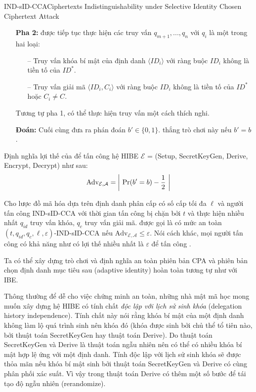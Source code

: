 \documentclass[class=report, crop=false]{standalone}
\begin{document}
\begin{game}{IND-sID-CCA}{Ciphertexts Indistinguishability under Selective Identity Chosen Ciphertext Attack}
\begin{itemize}[leftmargin=1.5cm, itemindent=-0.5cm]
					\item[] \textbf{Pha 2:} \adversary được tiếp tục thực hiện các truy vấn $q_{m + 1}, ..., q_{n}$ với $q_i$ là một trong hai loại:
					\begin{itemize}
						\item[--] Truy vấn khóa bí mật của định danh $\langle ID_i \rangle$ với ràng buộc $ID_i$ không là tiền tố của $ID^*$.
						\item[--] Truy vấn giải mã $\langle ID_i, C_i \rangle$ với ràng buộc $ID_i$ không là tiền tố của $ID^*$ hoặc $C_i \neq C$.
					\end{itemize}
					Tương tự pha 1, \adversary có thể thực hiện truy vấn một cách thích nghi.
					\item[] \textbf{Đoán:} Cuối cùng \adversary đưa ra phán đoán $b' \in \{0, 1\}$. \adversary thắng trò chơi này nếu $b' = b$.
				\end{itemize}
				\vspace{-\baselineskip}
				Định nghĩa lợi thế của \adversary để tấn công hệ HIBE $\mathcal{E}$ = (\textsf{Setup, SecretKeyGen, Derive, Encrypt, Decrypt}) như sau:
				\[
					\text{Adv}_{\mathcal{E}, \mathcal{A}} = \left| \ \text{Pr}(b' = b) - \frac{1}{2} \ \right|
				\]
			\end{game}
			\begin{definition}
				Cho lược đồ mã hóa dựa trên định danh phân cấp \scheme có số cấp tối đa $\ell$ và người tấn công IND-sID-CCA \adversary với thời gian tấn công bị chặn bởi $t$ và thực hiện nhiều nhất $q_{id}$ truy vấn khóa, $q_c$ truy vấn giải mã. \scheme được gọi là có mức an toàn $(t, q_{id}, q_c, \ell, \varepsilon)$-IND-sID-CCA nếu $\text{Adv}_{\mathcal{E}, \mathcal{A}} \leq \varepsilon$. Nói cách khác, mọi người tấn công có khả năng như \adversary có lợi thế nhiều nhất là $\varepsilon$ để tấn công \scheme.
			\end{definition}
			Ta có thể xây dựng trò chơi và định nghĩa an toàn phiên bản CPA và phiên bản chọn định danh mục tiêu sau (adaptive identity) hoàn toàn tương tự như với IBE.

			Thông thường để dễ cho việc chứng minh an toàn, những nhà mật mã học mong muốn xây dựng hệ HIBE có tính chất \textit{độc lập với lịch sử sinh khóa} (delegation history independence). Tính chất này nói rằng khóa bí mật của một định danh không làm lộ quá trình sinh nên khóa đó (khóa được sinh bởi chủ thể tổ tiên nào, bởi thuật toán \textsf{SecretKeyGen} hay thuật toán \textsf{Derive}). Do thuật toán \textsf{SecretKeyGen} và \textsf{Derive} là thuật toán ngẫu nhiên nên có thể có nhiều khóa bí mật hợp lệ ứng với một định danh. Tính độc lập với lịch sử sinh khóa sẽ được thỏa mãn nếu khóa bí mật sinh bởi thuật toán \textsf{SecretKeyGen} và \textsf{Derive} có cùng phân phối xác suất. Vì vậy trong thuật toán \textsf{Derive} có thêm một số bước để tái tạo độ ngẫu nhiên (rerandomize).
			
\end{document}
